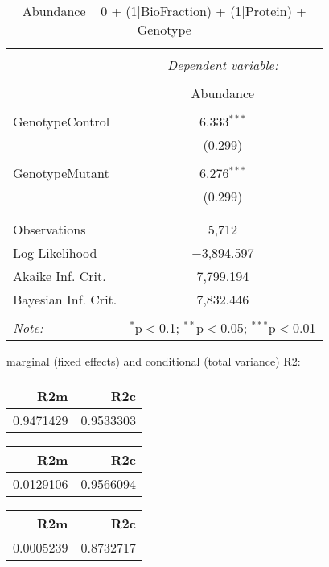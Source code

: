 \documentclass[11pt]{report}
\begin{document}
\begin{table}[!htbp] \centering 
  \caption{Abundance ~ 0 + (1|BioFraction) + (1|Protein) + Genotype} 
  \label{} 
\begin{tabular}{@{\extracolsep{5pt}}lc} 
\\[-1.8ex]\hline 
\hline \\[-1.8ex] 
 & \multicolumn{1}{c}{\textit{Dependent variable:}} \\ 
\cline{2-2} 
\\[-1.8ex] & Abundance \\ 
\hline \\[-1.8ex] 
 GenotypeControl & 6.333$^{***}$ \\ 
  & (0.299) \\ 
  & \\ 
 GenotypeMutant & 6.276$^{***}$ \\ 
  & (0.299) \\ 
  & \\ 
\hline \\[-1.8ex] 
Observations & 5,712 \\ 
Log Likelihood & $-$3,894.597 \\ 
Akaike Inf. Crit. & 7,799.194 \\ 
Bayesian Inf. Crit. & 7,832.446 \\ 
\hline 
\hline \\[-1.8ex] 
\textit{Note:}  & \multicolumn{1}{r}{$^{*}$p$<$0.1; $^{**}$p$<$0.05; $^{***}$p$<$0.01} \\ 
\end{tabular} 
\end{table} 
marginal (fixed effects) and conditional (total variance) R2:

\begin{tabular}{r|r}
\hline
R2m & R2c\\
\hline
0.9471429 & 0.9533303\\
\hline
\end{tabular}

\begin{tabular}{r|r}
\hline
R2m & R2c\\
\hline
0.0129106 & 0.9566094\\
\hline
\end{tabular}

\begin{tabular}{r|r}
\hline
R2m & R2c\\
\hline
0.0005239 & 0.8732717\\
\hline
\end{tabular}
\end{document}
